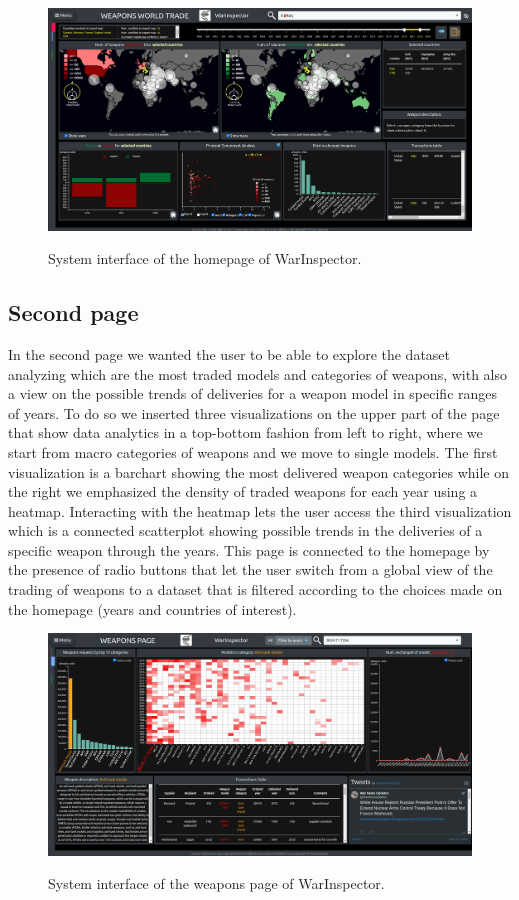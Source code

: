 \documentclass{article}
\begin{document}
\begin{multicols}{2}
\begin{figure}[ht!]
	\centering
	\includegraphics[scale=0.25,center]{./fig/screen1.png}
	\label{fig:va}
	\caption{System interface of the homepage of WarInspector.}
	
\end{figure}

\subsection{Second page}
In the second page we wanted the user to be able to explore the dataset analyzing which are the most traded models and categories of weapons, with also a view on the possible trends of deliveries for a weapon model in specific ranges of years.
To do so we inserted three visualizations on the upper part of the page that show data analytics in a top-bottom fashion from left to right, where we start from macro categories of weapons and we move to single models. The first visualization is a barchart showing the most delivered weapon categories while on the right we emphasized the density of traded weapons for each year using  a heatmap. Interacting with the heatmap lets the user access the third visualization which is a connected scatterplot showing possible trends in the deliveries of a specific weapon through the years. 
This page is connected to the homepage by the presence of radio buttons that let the user switch from a global view of the trading of weapons to a dataset that is filtered according to the choices made on the homepage (years and countries of interest). 


\begin{figure}[tb]
\centering
\includegraphics[scale=0.25,center]{./fig/screen2.png}
   \label{fig:va2}
    \caption{System interface of the weapons page of WarInspector.}


\end{figure}
\end{multicols}
\end{document}
